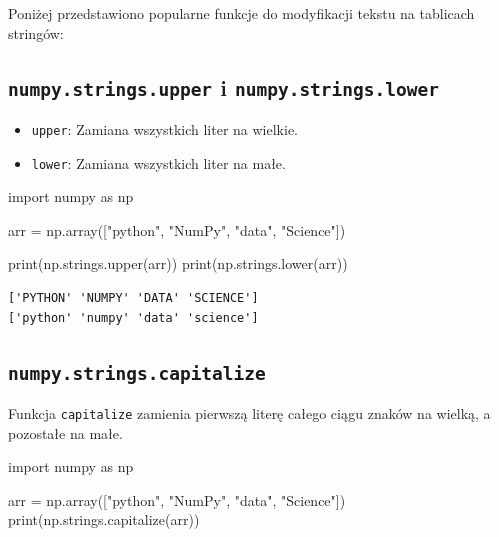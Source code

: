 \documentclass[
  polish,
  letterpaper,
  DIV=11,
  numbers=noendperiod]{scrreprt}
\newenvironment{Shaded}{\begin{snugshade}}{\end{snugshade}}
\newcommand{\BuiltInTok}[1]{\textcolor[rgb]{0.00,0.23,0.31}{#1}}
\newcommand{\ImportTok}[1]{\textcolor[rgb]{0.00,0.46,0.62}{#1}}
\newcommand{\NormalTok}[1]{\textcolor[rgb]{0.00,0.23,0.31}{#1}}
\newcommand{\OperatorTok}[1]{\textcolor[rgb]{0.37,0.37,0.37}{#1}}
\newcommand{\StringTok}[1]{\textcolor[rgb]{0.13,0.47,0.30}{#1}}
\providecommand{\tightlist}{%
  \setlength{\itemsep}{0pt}\setlength{\parskip}{0pt}}
\begin{document}
Poniżej przedstawiono popularne funkcje do modyfikacji tekstu na
tablicach stringów:

\subsection{\texorpdfstring{\texttt{numpy.strings.upper} i
\texttt{numpy.strings.lower}}{numpy.strings.upper i numpy.strings.lower}}\label{numpy.strings.upper-i-numpy.strings.lower}

\begin{itemize}
\tightlist
\item
  \texttt{upper}: Zamiana wszystkich liter na wielkie.
\item
  \texttt{lower}: Zamiana wszystkich liter na małe.
\end{itemize}

\begin{Shaded}
\begin{Highlighting}[]
\ImportTok{import}\NormalTok{ numpy }\ImportTok{as}\NormalTok{ np}

\NormalTok{arr }\OperatorTok{=}\NormalTok{ np.array([}\StringTok{"python"}\NormalTok{, }\StringTok{"NumPy"}\NormalTok{, }\StringTok{"data"}\NormalTok{, }\StringTok{"Science"}\NormalTok{])}

\BuiltInTok{print}\NormalTok{(np.strings.upper(arr))}
\BuiltInTok{print}\NormalTok{(np.strings.lower(arr))}
\end{Highlighting}
\end{Shaded}

\begin{verbatim}
['PYTHON' 'NUMPY' 'DATA' 'SCIENCE']
['python' 'numpy' 'data' 'science']
\end{verbatim}

\subsection{\texorpdfstring{\texttt{numpy.strings.capitalize}}{numpy.strings.capitalize}}\label{numpy.strings.capitalize}

Funkcja \texttt{capitalize} zamienia pierwszą literę całego ciągu znaków
na wielką, a pozostałe na małe.

\begin{Shaded}
\begin{Highlighting}[]
\ImportTok{import}\NormalTok{ numpy }\ImportTok{as}\NormalTok{ np}

\NormalTok{arr }\OperatorTok{=}\NormalTok{ np.array([}\StringTok{"python"}\NormalTok{, }\StringTok{"NumPy"}\NormalTok{, }\StringTok{"data"}\NormalTok{, }\StringTok{"Science"}\NormalTok{])}
\BuiltInTok{print}\NormalTok{(np.strings.capitalize(arr))}
\end{Highlighting}
\end{Shaded}
\end{document}
